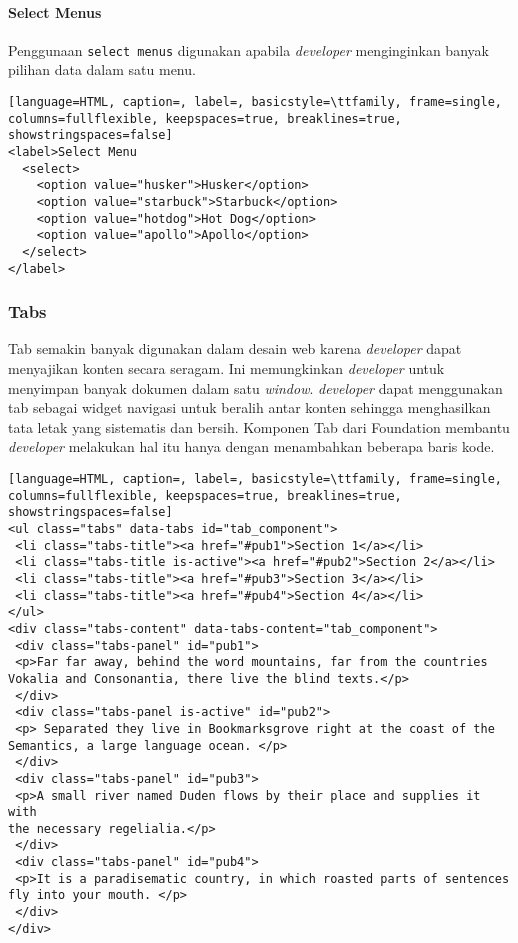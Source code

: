 \paragraph{Select Menus}
Penggunaan \texttt{select menus} digunakan apabila \textit{developer} menginginkan banyak pilihan data dalam satu menu.
\begin{lstlisting}[language=HTML, caption=, label=, basicstyle=\ttfamily, frame=single, columns=fullflexible, keepspaces=true, breaklines=true, showstringspaces=false] 
<label>Select Menu
  <select>
    <option value="husker">Husker</option>
    <option value="starbuck">Starbuck</option>
    <option value="hotdog">Hot Dog</option>
    <option value="apollo">Apollo</option>
  </select>
</label>
\end{lstlisting}


\subsubsection{Tabs}
Tab semakin banyak digunakan dalam desain web karena \textit{developer} dapat menyajikan konten secara seragam. Ini memungkinkan \textit{developer} untuk menyimpan banyak dokumen dalam satu \textit{window}. \textit{developer} dapat menggunakan tab sebagai widget navigasi untuk beralih antar konten sehingga menghasilkan tata letak yang sistematis dan bersih. Komponen Tab dari Foundation membantu \textit{developer} melakukan hal itu hanya dengan menambahkan beberapa baris kode. 

\begin{lstlisting}[language=HTML, caption=, label=, basicstyle=\ttfamily, frame=single, columns=fullflexible, keepspaces=true, breaklines=true, showstringspaces=false] 
<ul class="tabs" data-tabs id="tab_component">
 <li class="tabs-title"><a href="#pub1">Section 1</a></li>
 <li class="tabs-title is-active"><a href="#pub2">Section 2</a></li>
 <li class="tabs-title"><a href="#pub3">Section 3</a></li>
 <li class="tabs-title"><a href="#pub4">Section 4</a></li>
</ul>
<div class="tabs-content" data-tabs-content="tab_component">
 <div class="tabs-panel" id="pub1">
 <p>Far far away, behind the word mountains, far from the countries
Vokalia and Consonantia, there live the blind texts.</p>
 </div>
 <div class="tabs-panel is-active" id="pub2">
 <p> Separated they live in Bookmarksgrove right at the coast of the
Semantics, a large language ocean. </p>
 </div>
 <div class="tabs-panel" id="pub3">
 <p>A small river named Duden flows by their place and supplies it with
the necessary regelialia.</p>
 </div>
 <div class="tabs-panel" id="pub4">
 <p>It is a paradisematic country, in which roasted parts of sentences
fly into your mouth. </p>
 </div>
</div>
\end{lstlisting}

